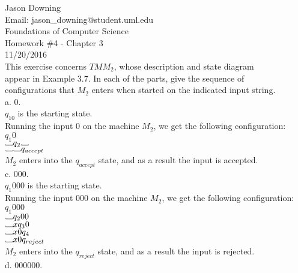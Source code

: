 \documentclass[12pt]{article}
\newcommand\Vtextvisiblespace[1][.8em]{%
	\mbox{\kern.07em\vrule height.3ex}%
	\vbox{\hrule width#1}%
	\hbox{\vrule height.3ex}}
\begin{document}
\noindent
Jason Downing \\
Email: jason\_downing@student.uml.edu \\
Foundations of Computer Science \\
Homework \#4 - Chapter 3 \\
11/20/2016 \\


 This exercise concerns $TM M_2$, whose description and state diagram \\
appear in Example 3.7. In each of the parts, give the sequence of \\
configurations that $M_2$ enters when started on the indicated input string. \\

a. 0. \\

$q_10$ is the starting state. \\
Running the input 0 on the machine $M_2$, we get the following configuration: \\

$q_1 0$ \\
$\Vtextvisiblespace q_2 \Vtextvisiblespace$ \\
$\Vtextvisiblespace  \Vtextvisiblespace q_{accept}$  \\
$M_2$ enters into the $q_{accept}$ state, and as a result the input is accepted. \\

c. 000. \\

$q_1 000$ is the starting state. \\
Running the input 000 on the machine $M_2$, we get the following configuration: \\

$q_1 000$ \\
$\Vtextvisiblespace q_2 00$ \\
$\Vtextvisiblespace x q_3 0$ \\
$\Vtextvisiblespace x0 q_4 $ \\
$\Vtextvisiblespace x0 q_{reject} $ \\
$M_2$ enters into the $q_{reject}$ state, and as a result the input is rejected. \\

\pagebreak
d. 000000. \\
\end{document}
